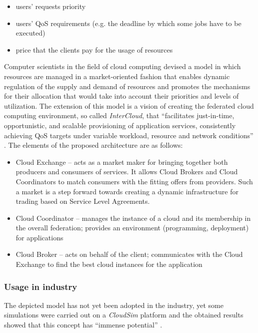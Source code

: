 \begin{itemize}
  \item users' requests priority
  \item users' QoS requirements (e.g. the deadline by which some jobs have to be executed)
  \item price that the clients pay for the usage of resources
\end{itemize}

Computer scientists in the field of cloud computing devised a model \cite{MarketOrientedCC08} in which resources are managed in a market-oriented fashion that enables dynamic regulation of the supply and demand of resources and promotes the mechanisms for their allocation that would take into account their priorities and levels of utilization.
The extension of this model is a vision of creating the federated cloud computing environment, so called \emph{InterCloud}, that ``facilitates just-in-time, opportunistic, and scalable provisioning of application services, consistently achieving QoS targets under variable workload, resource and network conditions'' \cite{InterCloud10}.
The elements of the proposed architecture are as follows:
\begin{itemize}
  \item Cloud Exchange -- acts as a market maker for bringing together both producers and consumers of services. It allows Cloud Brokers and Cloud Coordinators to match consumers with the fitting offers from providers. Such a market is a step forward towards creating a dynamic infrastructure for trading based on Service Level Agreements.
  \item Cloud Coordinator -- manages the instance of a cloud and its membership in the overall federation; provides an environment (programming, deployment) for applications
  \item Cloud Broker -- acts on behalf of the client; communicates with the Cloud Exchange to find the best cloud instances for the application
\end{itemize}

\subsubsection{Usage in industry}
The depicted model has not yet been adopted in the industry, yet some simulations were carried out on a \emph{CloudSim} platform and the obtained results showed that this concept has ``immense potential'' \cite{InterCloud10}.


